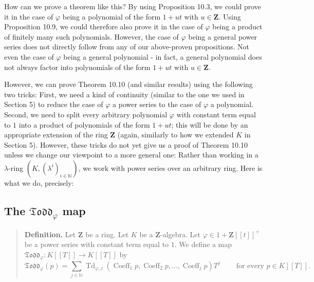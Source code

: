 \documentclass[numbers=enddot,12pt,final,onecolumn,notitlepage]{scrartcl}%
\begin{document}
How can we prove a theorem like this? By using Proposition 10.3, we could
prove it in the case of $\varphi$ being a polynomial of the form $1+ut$ with
$u\in\mathbf{Z}$. Using Proposition 10.9, we could therefore also prove it in
the case of $\varphi$ being a product of finitely many such polynomials.
However, the case of $\varphi$ being a general power series does not directly
follow from any of our above-proven propositions. Not even the case of
$\varphi$ being a general polynomial - in fact, a general polynomial does not
always factor into polynomials of the form $1+ut$ with $u\in\mathbf{Z}$.

However, we can prove Theorem 10.10 (and similar results) using the following
two tricks: First, we need a kind of continuity (similar to the one we used in
Section 5) to reduce the case of $\varphi$ a power series to the case of
$\varphi$ a polynomial. Second, we need to split every arbitrary polynomial
$\varphi$ with constant term equal to $1$ into a product of polynomials of the
form $1+ut$; this will be done by an appropriate extension of the ring
$\mathbf{Z}$ (again, similarly to how we extended $K$ in Section 5). However,
these tricks do not yet give us a proof of Theorem 10.10 unless we change our
viewpoint to a more general one: Rather than working in a $\lambda$-ring
$\left(  K,\left(  \lambda^{i}\right)  _{i\in\mathbb{N}}\right)  $, we work
with power series over an arbitrary ring. Here is what we do, precisely:

\subsection{The $\mathfrak{Todd}_{\varphi}$ map}

\begin{quote}
\textbf{Definition.} Let $\mathbf{Z}$ be a ring. Let $K$ be a $\mathbf{Z}%
$-algebra. Let $\varphi\in1+\mathbf{Z}\left[  \left[  t\right]  \right]  ^{+}$
be a power series with constant term equal to $1$. We define a map
$\mathfrak{Todd}_{\varphi}:K\left[  \left[  T\right]  \right]  \rightarrow
K\left[  \left[  T\right]  \right]  $ by
\begin{equation}
\mathfrak{Todd}_{\varphi}\left(  p\right)  =\sum\limits_{j\in\mathbb{N}%
}\operatorname*{Td}\nolimits_{\varphi,j}\left(  \operatorname*{Coeff}%
\nolimits_{1}p,\operatorname*{Coeff}\nolimits_{2}p,...,\operatorname*{Coeff}%
\nolimits_{j}p\right)  T^{j}\ \ \ \ \ \ \ \ \ \ \text{for every }p\in K\left[
\left[  T\right]  \right]  . \label{ToddFrak}%
\end{equation}



\end{quote}
\end{document}
